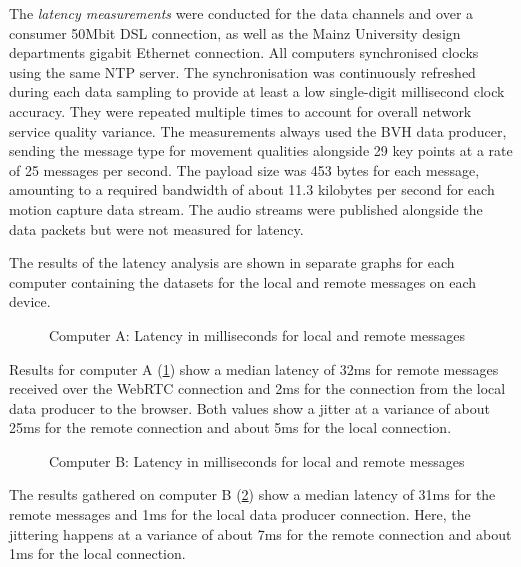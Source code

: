 The \emph{latency measurements} were conducted for the data channels and over a consumer 50Mbit \ac{DSL} connection, as well as the Mainz University design department\textquotesingle s gigabit Ethernet connection.
All computers synchronised clocks using the same \ac{NTP} server.
The synchronisation was continuously refreshed during each data sampling to provide at least a low single-digit millisecond clock accuracy.
They were repeated multiple times to account for overall network service quality variance.
The measurements always used the \ac{BVH} data producer, sending the message type for movement qualities alongside 29 key points at a rate of 25 messages per second.
The payload size was 453 bytes for each message, amounting to a required bandwidth of about 11.3 kilobytes per second for each motion capture data stream.
The audio streams were published alongside the data packets but were not measured for latency.

The results of the latency analysis are shown in separate graphs for each computer containing the datasets for the local and remote messages on each device.

\begin{figure}[h]
\centering

\caption[Message latency on Computer A]{Computer A: Latency in milliseconds for local and remote messages\protect}
\label{fig:latencyComputerA}
\end{figure}

Results for computer A (\ref{fig:latencyComputerA}) show a median latency of 32ms for remote messages received over the WebRTC connection and 2ms for the connection from the local data producer to the browser.
Both values show a jitter at a variance of about 25ms for the remote connection and about 5ms for the local connection.

\begin{figure}[h]
\centering

\caption[Message latency on Computer B]{Computer B: Latency in milliseconds for local and remote messages\protect}
\label{fig:latencyComputerB}
\end{figure}

The results gathered on computer B (\ref{fig:latencyComputerB}) show a median latency of 31ms for the remote messages and 1ms for the local data producer connection.
Here, the jittering happens at a variance of about 7ms for the remote connection and about 1ms for the local connection.

